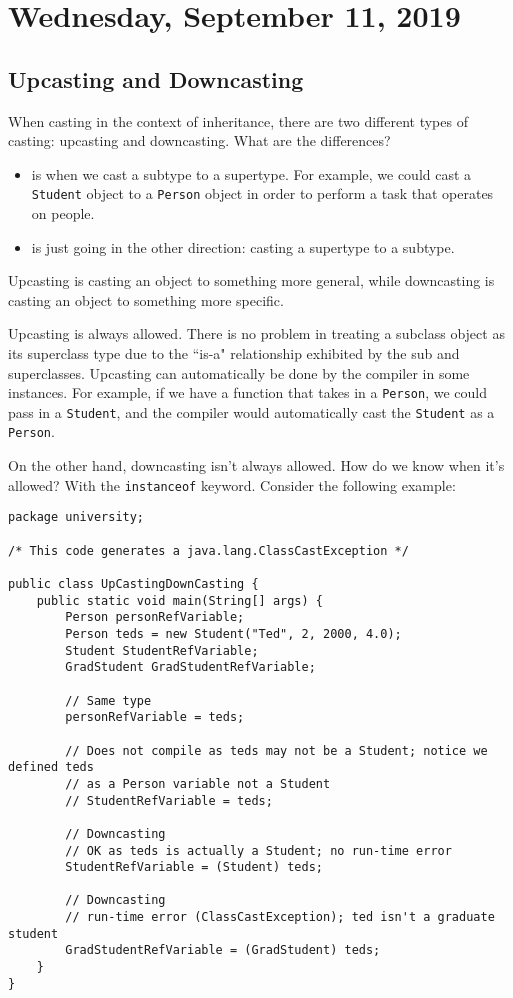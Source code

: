 \section{Wednesday, September 11, 2019}
\subsection{Upcasting and Downcasting}
When casting in the context of inheritance, there are two different types of casting: upcasting and downcasting. What are the differences?
\begin{itemize}
    \item {} is when we cast a subtype to a supertype. For example, we could cast a \verb!Student! object to a \verb!Person! object in order to perform a task that operates on people.
    \item {} is just going in the other direction: casting a supertype to a subtype.
\end{itemize}

Upcasting is casting an object to something more general, while downcasting is casting an object to something more specific.


Upcasting is always allowed. There is no problem in treating a subclass object as its superclass type due to the ``is-a" relationship exhibited by the sub and superclasses. Upcasting can automatically be done by the compiler in some instances. For example, if we have a function that takes in a \verb!Person!, we could pass in a \verb!Student!, and the compiler would automatically cast the \verb!Student! as a \verb!Person!.

On the other hand, downcasting isn't always allowed. How do we know when it's allowed? With the \verb!instanceof! keyword. Consider the following example:


\begin{lstlisting}
package university;

/* This code generates a java.lang.ClassCastException */

public class UpCastingDownCasting {
	public static void main(String[] args) {
		Person personRefVariable;
		Person teds = new Student("Ted", 2, 2000, 4.0);
		Student StudentRefVariable;
		GradStudent GradStudentRefVariable;

		// Same type
		personRefVariable = teds;

		// Does not compile as teds may not be a Student; notice we defined teds
		// as a Person variable not a Student
		// StudentRefVariable = teds;

		// Downcasting
		// OK as teds is actually a Student; no run-time error
		StudentRefVariable = (Student) teds;

		// Downcasting
		// run-time error (ClassCastException); ted isn't a graduate student
		GradStudentRefVariable = (GradStudent) teds;
	}
}
\end{lstlisting}

